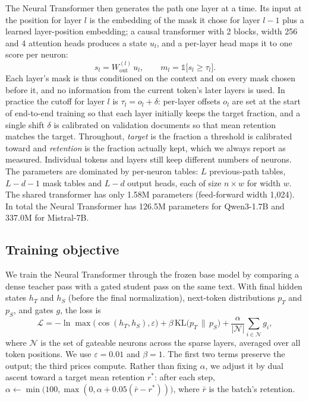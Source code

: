 \documentclass[10pt,twocolumn,letterpaper]{article}
\begin{document}
The Neural Transformer then generates the path one layer at a time. Its input at the position for layer $l$ is the embedding of the mask it chose for layer $l-1$ plus a learned layer-position embedding; a causal transformer with 2 blocks, width 256 and 4 attention heads produces a state $u_l$, and a per-layer head maps it to one score per neuron:
\begin{equation}
s_l = W^{(l)}_{\mathrm{out}}\,u_l, \qquad m_l = \mathbb{1}\big[s_l \ge \tau_l\big].
\end{equation}
Each layer's mask is thus conditioned on the context and on every mask chosen before it, and no information from the current token's later layers is used. In practice the cutoff for layer $l$ is $\tau_l=o_l+\delta$: per-layer offsets $o_l$ are set at the start of end-to-end training so that each layer initially keeps the target fraction, and a single shift $\delta$ is calibrated on validation documents so that mean retention matches the target. Throughout, \emph{target} is the fraction a threshold is calibrated toward and \emph{retention} is the fraction actually kept, which we always report as measured. Individual tokens and layers still keep different numbers of neurons. The parameters are dominated by per-neuron tables: $L$ previous-path tables, $L-d-1$ mask tables and $L-d$ output heads, each of size $n\times w$ for width $w$. The shared transformer has only 1.58M parameters (feed-forward width 1,024). In total the Neural Transformer has 126.5M parameters for Qwen3-1.7B and 337.0M for Mistral-7B.

\subsection{Training objective}

We train the Neural Transformer through the frozen base model by comparing a dense teacher pass with a gated student pass on the same text. With final hidden states $h_T$ and $h_S$ (before the final normalization), next-token distributions $p_T$ and $p_S$, and gates $g$, the loss is
\begin{equation}
\mathcal{L} = -\ln\max\big(\cos(h_T, h_S),\varepsilon\big) + \beta\,\mathrm{KL}\big(p_T \,\|\, p_S\big) + \frac{\alpha}{|\mathcal{N}|}\sum_{i \in \mathcal{N}} g_i,
\end{equation}
where $\mathcal{N}$ is the set of gateable neurons across the sparse layers, averaged over all token positions. We use $\varepsilon=0.01$ and $\beta=1$. The first two terms preserve the output; the third prices compute. Rather than fixing $\alpha$, we adjust it by dual ascent toward a target mean retention $r^\ast$: after each step, $\alpha\leftarrow\min\big(100,\max(0,\alpha+0.05(\bar r-r^\ast))\big)$, where $\bar r$ is the batch's retention.
\end{document}
